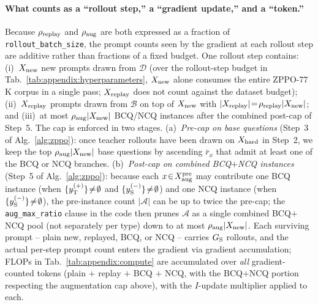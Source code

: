 \documentclass{llmxive}
\begin{document}
\paragraph{What counts as a ``rollout step,'' a ``gradient update,'' and a ``token.''} Because $\rho_{\rm replay}$ and $\rho_{\rm aug}$ are both expressed as a fraction of \texttt{rollout\_batch\_size}, the prompt counts seen by the gradient at each rollout step are additive rather than fractions of a fixed budget. One rollout step contains: (i)~$X_{\rm new}$ new prompts drawn from $\mathcal{D}$ (over the rollout-step budget in Tab.~\ref{tab:appendix:hyperparameters}, $X_{\rm new}$ alone consumes the entire ZPPO-$77$K corpus in a single pass; $X_{\rm replay}$ does not count against the dataset budget); (ii)~$X_{\rm replay}$ prompts drawn from $\mathcal{B}$ on top of $X_{\rm new}$ with $|X_{\rm replay}|\!=\!\rho_{\rm replay}|X_{\rm new}|$; and (iii)~at most $\rho_{\rm aug}|X_{\rm new}|$ BCQ/NCQ instances after the combined post-cap of Step~5. The cap is enforced in two stages. (a)~\emph{Pre-cap on base questions} (Step~3 of Alg.~\ref{alg:zppo}): once teacher rollouts have been drawn on $X_{\rm hard}$ in Step~2, we keep the top $\rho_{\rm aug}|X_{\rm new}|$ base questions by ascending $\bar{r}_x$ that admit at least one of the BCQ or NCQ branches. (b)~\emph{Post-cap on combined BCQ$+$NCQ instances} (Step~5 of Alg.~\ref{alg:zppo}): because each $x\!\in\!X_{\rm aug}^{\rm pre}$ may contribute one BCQ instance (when $\{y_{\rm T}^{(+)}\}\!\neq\!\emptyset$ and $\{y_{\rm S}^{(-)}\}\!\neq\!\emptyset$) and one NCQ instance (when $\{y_{\rm S}^{(-)}\}\!\neq\!\emptyset$), the pre-instance count $|\mathcal{A}|$ can be up to twice the pre-cap; the \texttt{aug\_max\_ratio} clause in the code then prunes $\mathcal{A}$ as a single combined BCQ$+$NCQ pool (not separately per type) down to at most $\rho_{\rm aug}|X_{\rm new}|$. Each surviving prompt -- plain new, replayed, BCQ, or NCQ -- carries $G_{\rm S}$ rollouts, and the actual per-step prompt count enters the gradient via gradient accumulation; FLOPs in Tab.~\ref{tab:appendix:compute} are accumulated over \emph{all} gradient-counted tokens (plain $+$ replay $+$ BCQ $+$ NCQ, with the BCQ$+$NCQ portion respecting the augmentation cap above), with the $I$-update multiplier applied to each.
\end{document}
